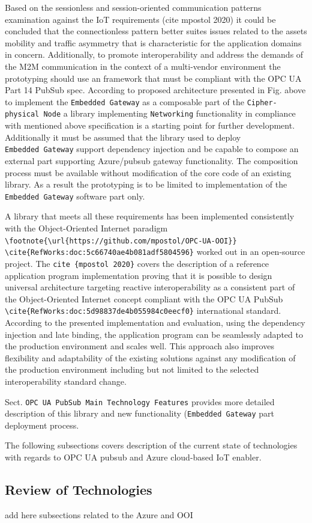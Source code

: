 \documentclass[
]{article}
\begin{document}
Based on the sessionless and session-oriented communication patterns
examination against the IoT requirements (cite mpostol 2020) it could be
concluded that the connectionless pattern better suites issues related
to the assets mobility and traffic asymmetry that is characteristic for
the application domains in concern. Additionally, to promote
interoperability and address the demands of the M2M communication in the
context of a multi-vendor environment the prototyping should use an
framework that must be compliant with the OPC UA Part 14 PubSub spec.
According to proposed architecture presented in Fig. above to implement
the \texttt{Embedded\ Gateway} as a composable part of the
\texttt{Cipher-physical\ Node} a library implementing
\texttt{Networking} functionality in compliance with mentioned above
specification is a starting point for further development. Additionally
it must be assumed that the library used to deploy
\texttt{Embedded\ Gateway} support dependency injection and be capable
to compose an external part supporting Azure/pubsub gateway
functionality. The composition process must be available without
modification of the core code of an existing library. As a result the
prototyping is to be limited to implementation of the
\texttt{Embedded\ Gateway} software part only.

A library that meets all these requirements has been implemented
consistently with the Object-Oriented Internet paradigm
\texttt{\textbackslash{}footnote\{\textbackslash{}url\{https://github.com/mpostol/OPC-UA-OOI\}\}}
\texttt{\textbackslash{}cite\{RefWorks:doc:5c66740ae4b081adf5804596\}}
worked out in an open-source project. The
\texttt{cite\ \{mpostol\ 2020\}} covers the description of a reference
application program implementation proving that it is possible to design
universal architecture targeting reactive interoperability as a
consistent part of the Object-Oriented Internet concept compliant with
the OPC UA PubSub
\texttt{\textbackslash{}cite\{RefWorks:doc:5d98837de4b055984c0eecf0\}}
international standard. According to the presented implementation and
evaluation, using the dependency injection and late binding, the
application program can be seamlessly adapted to the production
environment and scales well. This approach also improves flexibility and
adaptability of the existing solutions against any modification of the
production environment including but not limited to the selected
interoperability standard change.

Sect. \texttt{OPC\ UA\ PubSub\ Main\ Technology\ Features} provides more
detailed description of this library and new functionality
(\texttt{Embedded\ Gateway} part deployment process.

The following subsections covers description of the current state of
technologies with regards to OPC UA pubsub and Azure cloud-based IoT
enabler.

\hypertarget{review-of-technologies}{%
\subsection{Review of Technologies}\label{review-of-technologies}}

add here subsections related to the Azure and OOI
\end{document}
